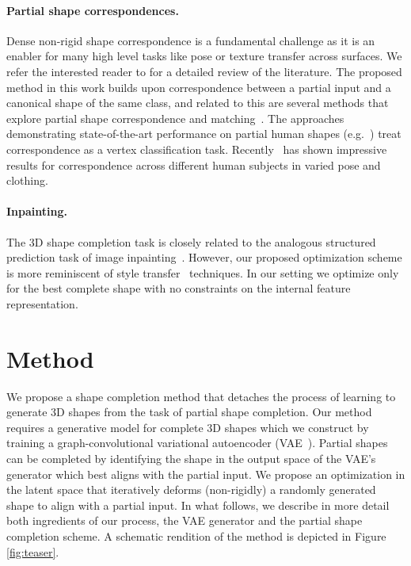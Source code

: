 \documentclass[10pt,twocolumn,letterpaper]{article}
\begin{document}
\paragraph{Partial shape correspondences.}
Dense non-rigid shape correspondence \cite{kim11,chen15,fmnet,rodola14,bronstein2006generalized} is a fundamental challenge as it is an enabler for many high level tasks like pose or texture transfer across surfaces. We refer the interested reader to \cite{van2011survey,biasotti2015recent} for a detailed review of the literature. The proposed method in this work builds upon correspondence between a partial input and a canonical shape of the same class, and related to this are several methods that explore partial shape correspondence and matching~\cite{rodola16-partial,monet,litany17fully}. The approaches demonstrating state-of-the-art performance on partial human shapes (e.g.~\cite{monet}) treat correspondence as a vertex classification task. Recently~\cite{wei2016dense} has shown impressive results for correspondence across different human subjects in varied pose and clothing. 

\paragraph{Inpainting.}
The 3D shape completion task is closely related to the analogous structured prediction task of image inpainting~\cite{pathakCVPR16context,Yang_2017_CVPR}. However, our proposed optimization scheme is more reminiscent of style transfer~\cite{gatysStyleTransfer} techniques. In our setting we optimize only for the best complete shape with no constraints on the internal feature representation.
%
%
%
\section{Method}\label{sec:method}
We propose a shape completion method that detaches the process of learning to generate 3D shapes from the task of partial shape completion. Our method requires a generative model for complete 3D shapes which we construct by training a graph-convolutional variational autoencoder (VAE~\cite{kingma2014iclr}). Partial shapes can be completed by identifying the shape in the output space of the VAE's generator which best aligns with the partial input. We propose an optimization in the latent space that iteratively deforms (non-rigidly) a randomly generated shape to align with a partial input. In what follows, we describe in more detail both ingredients of our process, the VAE generator and the partial shape completion scheme. A schematic rendition of the method is depicted in Figure \ref{fig:teaser}.
\end{document}
